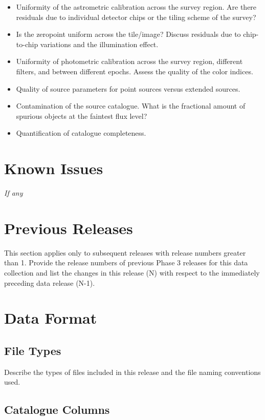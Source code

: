 \documentclass[a4paper,10pt]{book}
\begin{document}
\begin{itemize}
\item Uniformity of the astrometric calibration across the survey region. Are there residuals due to individual detector chips or the tiling scheme of the survey?
\item Is the zeropoint uniform across the tile/image? Discuss residuals due to chip-to-chip variations and the illumination effect.
\item Uniformity of photometric calibration across the survey region, different filters, and between different epochs. Assess the quality of the color indices.
\item Quality of source parameters for point sources versus extended sources.
\item Contamination of the source catalogue. What is the fractional amount of spurious objects at the faintest flux level?
\item Quantification of catalogue completeness.
\end{itemize}

\section{Known Issues}

\textit{If any}

\section{Previous Releases}

This section applies only to subsequent releases with release numbers greater than 1. Provide the release numbers of previous Phase 3 releases for this data collection and list the changes in this release (N) with respect to the immediately preceding data release (N-1).

\section{Data Format}

\subsection{File Types}

Describe the types of files included in this release and the file naming conventions used.

\subsection{Catalogue Columns}
\end{document}
